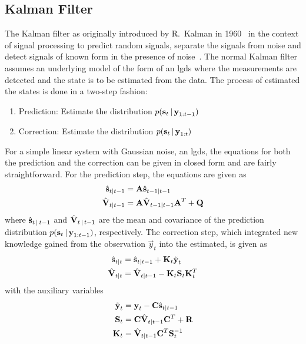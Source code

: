 	\subsection{Kalman Filter}
		The Kalman filter as originally introduced by R.~Kalman in 1960~\cite{kalmanNewApproachLinear1960} in the context of signal processing to predict random signals, separate the signals from noise and detect signals of known form in the presence of noise~\cite{kalmanNewApproachLinear1960}. The normal Kalman filter assumes an underlying model of the form of an \ac{lgds} where the measurements are detected and the state is to be estimated from the data. The process of estimated the states is done in a two-step fashion:
		\begin{enumerate}
			\item Prediction: \tabto{2.5cm} Estimate the distribution \( p(\boldsymbol{\mathrm{s}}_t \,\vert\, \boldsymbol{\mathrm{y}}_{1:t - 1}) \)
			\item Correction: \tabto{2.5cm} Estimate the distribution \( p(\boldsymbol{\mathrm{s}}_t \,\vert\, \boldsymbol{\mathrm{y}}_{1:t}) \)
		\end{enumerate}
		For a simple linear system with Gaussian noise, \ie an \ac{lgds}, the equations for both the prediction and the correction can be given in closed form and are fairly straightforward. For the prediction step, the equations are given as
		\begin{align}
			\hat{\boldsymbol{\mathrm{s}}}_{t \vert t - 1} &= \boldsymbol{\mathrm{A}} \hat{\boldsymbol{\mathrm{s}}}_{t - 1 \vert t - 1}  \label{eqn:kfStatePre} \\
			\hat{\boldsymbol{\mathrm{V}}}_{t \vert t - 1} &= \boldsymbol{\mathrm{A}} \hat{\boldsymbol{\mathrm{V}}}_{t - 1 \vert t - 1} \boldsymbol{\mathrm{A}}^T + \boldsymbol{\mathrm{Q}}  \label{eqn:kfCovPre}
		\end{align}
		where \( \hat{\boldsymbol{\mathrm{s}}}_{t \,\vert\, t - 1} \) and \( \hat{\boldsymbol{\mathrm{V}}}_{t \,\vert\, t - 1} \) are the mean and covariance of the prediction distribution \( p(\boldsymbol{\mathrm{s}}_t \,\vert\, \boldsymbol{\mathrm{y}}_{1:t - 1}) \), respectively. The correction step, which integrated new knowledge gained from the observation \( \vec{y}_t \) into the estimated, is given as
		\begin{align}
			\hat{\boldsymbol{\mathrm{s}}}_{t \vert t} &= \hat{\boldsymbol{\mathrm{s}}}_{t \vert t - 1} + \boldsymbol{\mathrm{K}}_t \tilde{\boldsymbol{\mathrm{y}}}_t  \label{eqn:kfStatePost} \\
			\hat{\boldsymbol{\mathrm{V}}}_{t \vert t} &= \hat{\boldsymbol{\mathrm{V}}}_{t \vert t - 1} - \boldsymbol{\mathrm{K}}_t \boldsymbol{\mathrm{S}}_t \boldsymbol{\mathrm{K}}_t^T  \label{eqn:kfCovPost}
		\end{align}
		with the auxiliary variables
		\begin{align}
			\tilde{\boldsymbol{\mathrm{y}}}_t &= \boldsymbol{\mathrm{y}}_t - \boldsymbol{\mathrm{C}} \hat{\boldsymbol{\mathrm{s}}}_{t \vert t - 1}  \label{eqn:kfInno} \\
			\boldsymbol{\mathrm{S}}_t &= \boldsymbol{\mathrm{C}} \hat{\boldsymbol{\mathrm{V}}}_{t \vert t - 1} \boldsymbol{\mathrm{C}}^T + \boldsymbol{\mathrm{R}}  \label{eqn:kfResCov} \\
			\boldsymbol{\mathrm{K}}_t &= \hat{\boldsymbol{\mathrm{V}}}_{t \vert t - 1} \boldsymbol{\mathrm{C}}^T \boldsymbol{\mathrm{S}}_t^{-1}  \label{eqn:kfKalmanGain}
		\end{align}
